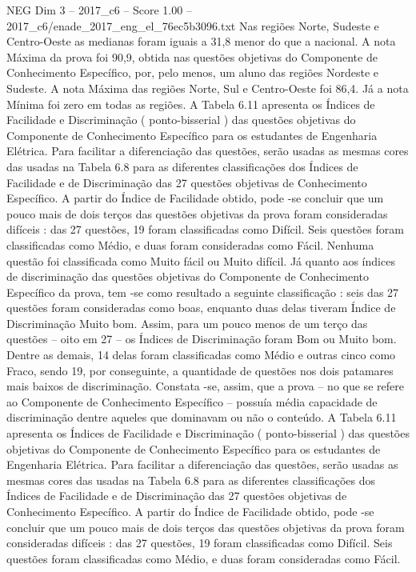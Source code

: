 \begin{textsample}{NEG Dim 3 – 2017\_c6 – Score 1.00 – 2017\_c6/enade\_2017\_eng\_el\_76ec5b3096.txt}
Nas regiões Norte, Sudeste e Centro-Oeste as medianas foram iguais a 31,8 menor do que a nacional.
A nota Máxima da prova foi 90,9, obtida nas questões objetivas do Componente de Conhecimento Específico, por, pelo menos, um aluno das regiões Nordeste e Sudeste.
A nota Máxima das regiões Norte, Sul e Centro-Oeste foi 86,4.
Já a nota Mínima foi zero em todas as regiões.
A Tabela 6.11 apresenta os Índices de Facilidade e Discriminação ( ponto-bisserial ) das questões objetivas do Componente de Conhecimento Específico para os estudantes de Engenharia Elétrica.
Para facilitar a diferenciação das questões, serão usadas as mesmas cores das usadas na Tabela 6.8 para as diferentes classificações dos Índices de Facilidade e de Discriminação das 27 questões objetivas de Conhecimento Específico.
A partir do Índice de Facilidade obtido, pode -se concluir que um pouco mais de dois terços das questões objetivas da prova foram consideradas difíceis : das 27 questões, 19 foram classificadas como Difícil.
Seis questões foram classificadas como Médio, e duas foram consideradas como Fácil.
Nenhuma questão foi classificada como Muito fácil ou Muito difícil.
Já quanto aos índices de discriminação das questões objetivas do Componente de Conhecimento Específico da prova, tem -se como resultado a seguinte classificação : seis das 27 questões foram consideradas como boas, enquanto duas delas tiveram Índice de Discriminação Muito bom.
Assim, para um pouco menos de um terço das questões – oito em 27 – os Índices de Discriminação foram Bom ou Muito bom.
Dentre as demais, 14 delas foram classificadas como Médio e outras cinco como Fraco, sendo 19, por conseguinte, a quantidade de questões nos dois patamares mais baixos de discriminação.
Constata -se, assim, que a prova – no que se refere ao Componente de Conhecimento Específico – possuía média capacidade de discriminação dentre aqueles que dominavam ou não o conteúdo.
A Tabela 6.11 apresenta os Índices de Facilidade e Discriminação ( ponto-bisserial ) das questões objetivas do Componente de Conhecimento Específico para os estudantes de Engenharia Elétrica.
Para facilitar a diferenciação das questões, serão usadas as mesmas cores das usadas na Tabela 6.8 para as diferentes classificações dos Índices de Facilidade e de Discriminação das 27 questões objetivas de Conhecimento Específico.
A partir do Índice de Facilidade obtido, pode -se concluir que um pouco mais de dois terços das questões objetivas da prova foram consideradas difíceis : das 27 questões, 19 foram classificadas como Difícil.
Seis questões foram classificadas como Médio, e duas foram consideradas como Fácil.

\end{textsample}
